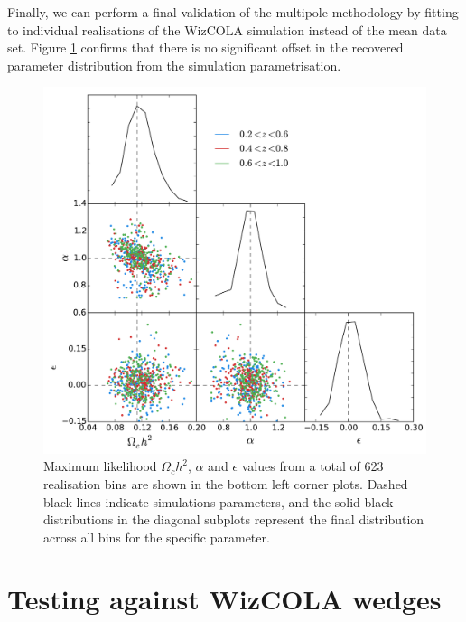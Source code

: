 \documentclass[titlesmallcaps, examinerscopy, copyrightpage]{uqthesis}
\begin{document}
Finally, we can perform a final validation of the multipole methodology by fitting to individual realisations of the WizCOLA simulation instead of the mean data set. Figure \ref{fig:mpDist2} confirms that there is no significant offset in the recovered parameter distribution from the simulation parametrisation.


\begin{figure}[h!]
  \begin{center}
    \includegraphics[width=\textwidth]{images/mpDist2.pdf}
  \end{center}
  \caption{Maximum likelihood $\Omega_c h^2$, $\alpha$ and $\epsilon$ values from a total of 623 realisation bins are shown in the bottom left corner plots. Dashed black lines indicate simulations parameters, and the solid black distributions in the diagonal subplots represent the final distribution across all bins for the specific parameter.}
  \label{fig:mpDist2}
\end{figure}


\newpage \phantom{blabla} \clearpage

\section{Testing against WizCOLA wedges}
\end{document}
